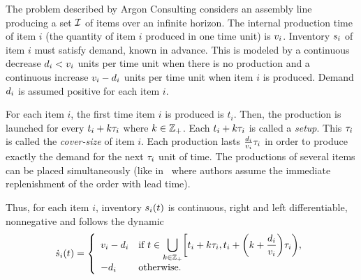 The problem described by Argon Consulting considers an assembly line producing a set $\mathcal{I}$ of items over an infinite horizon.
The internal production time of item $i$ (\ie the quantity of item $i$ produced in one time unit) is $v_i$.
Inventory $s_i$ of item $i$ must satisfy demand, known in advance.
This is modeled by a continuous decrease $d_i<v_i$ units per time unit when there is no production and a continuous increase $v_i-d_i$ units per time unit when item $i$ is produced.
Demand $d_i$ is assumed positive for each item $i$.


For each item $i$, the first time item $i$ is produced is $t_i$.
Then, the production is launched for every $t_i+k\tau_i$ where $k\in\mathbb{Z}_+$.
Each $t_i+k\tau_i$ is called a \emph{setup}.
This $\tau_i$ is called the \emph{cover-size} of item $i$.
Each production lasts $\frac{d_i}{v_i}\tau_i$ in order to produce exactly the demand for the next $\tau_i$ unit of time.
The productions of several items can be placed simultaneously (like in~\cite{Ohno2001} where authors assume the immediate replenishment of the order with lead time).



Thus, for each item $i$, inventory $\inventory_i\bracket{t}$ is continuous, right and left differentiable, nonnegative and follows the dynamic
\begin{equation}\label{eq:lot-size:single-line:deterministic:motivations:dynamic}
  \dot{\inventory}_i\bracket{t} =
  \left\{
  \begin{array}{ll}
  \rate_i-\demand_i
  & \ds\mbox{if}\ t\in\bigcup_{k\in\ZZ_+} \left[t_i+k\cover_i,t_i+\bracket{k+\frac{\demand_i}{\rate_i}}\cover_i\right),
  \\
  -\demand_i
  & \mbox{otherwise}.
  \end{array}
  \right.
\end{equation}


